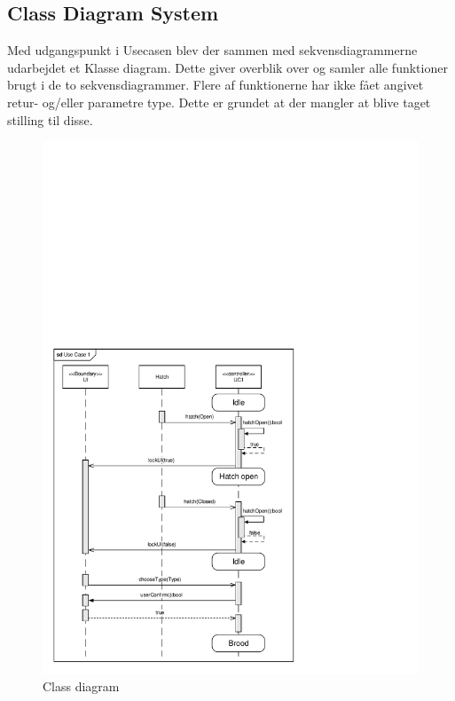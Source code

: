 
\subsection{Class Diagram System}

Med udgangspunkt i Usecasen blev der sammen med sekvensdiagrammerne udarbejdet et Klasse diagram. Dette giver overblik over og samler alle funktioner brugt i de to sekvensdiagrammer. Flere af funktionerne har ikke fået angivet retur- og/eller parametre type. Dette er grundet at der mangler at blive taget stilling til disse.

\begin{figure}[H]
\centering
\includegraphics[page=4,width=\linewidth,viewport=7mm 7mm 108mm 68mm]{./2_systemarkitektur/diagrammer/ArkitekturDiagrammer.pdf}
\caption[Diagram]{Class diagram}
\label{fig:SystemStateDiagram}
\end{figure}

\clearpage